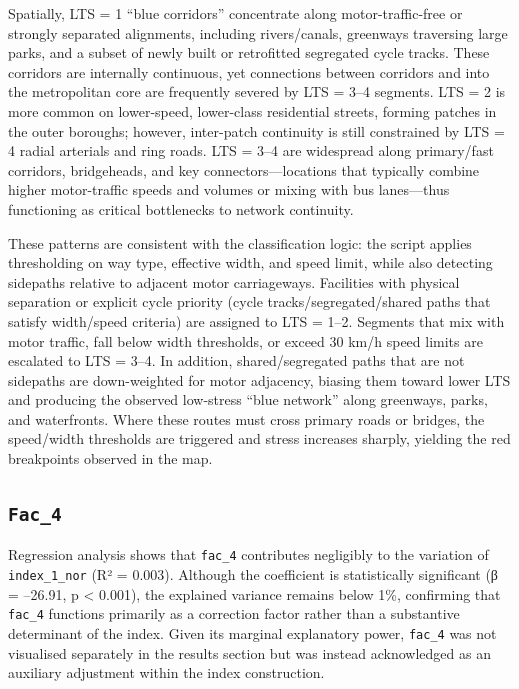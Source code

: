 \documentclass[
  12pt,
  oneside]{book}
\begin{document}
Spatially, LTS = 1 ``blue corridors'' concentrate along motor-traffic-free or strongly separated alignments, including rivers/canals, greenways traversing large parks, and a subset of newly built or retrofitted segregated cycle tracks. These corridors are internally continuous, yet connections between corridors and into the metropolitan core are frequently severed by LTS = 3--4 segments. LTS = 2 is more common on lower-speed, lower-class residential streets, forming patches in the outer boroughs; however, inter-patch continuity is still constrained by LTS = 4 radial arterials and ring roads. LTS = 3--4 are widespread along primary/fast corridors, bridgeheads, and key connectors---locations that typically combine higher motor-traffic speeds and volumes or mixing with bus lanes---thus functioning as critical bottlenecks to network continuity.

These patterns are consistent with the classification logic: the script applies thresholding on way type, effective width, and speed limit, while also detecting sidepaths relative to adjacent motor carriageways. Facilities with physical separation or explicit cycle priority (cycle tracks/segregated/shared paths that satisfy width/speed criteria) are assigned to LTS = 1--2. Segments that mix with motor traffic, fall below width thresholds, or exceed 30 km/h speed limits are escalated to LTS = 3--4. In addition, shared/segregated paths that are not sidepaths are down-weighted for motor adjacency, biasing them toward lower LTS and producing the observed low-stress ``blue network'' along greenways, parks, and waterfronts. Where these routes must cross primary roads or bridges, the speed/width thresholds are triggered and stress increases sharply, yielding the red breakpoints observed in the map.

\subsection{\texorpdfstring{\texttt{Fac\_4}}{Fac\_4}}\label{fac_4}

Regression analysis shows that \texttt{fac\_4} contributes negligibly to the variation of \texttt{index\_1\_nor} (R² = 0.003). Although the coefficient is statistically significant (β = --26.91, p \textless{} 0.001), the explained variance remains below 1\%, confirming that \texttt{fac\_4} functions primarily as a correction factor rather than a substantive determinant of the index. Given its marginal explanatory power, \texttt{fac\_4} was not visualised separately in the results section but was instead acknowledged as an auxiliary adjustment within the index construction.
\end{document}
